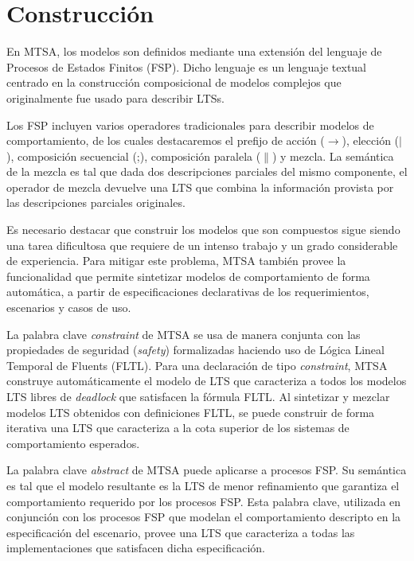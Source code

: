\section{Construcción}

En MTSA, los modelos son definidos mediante una extensión del lenguaje de Procesos de Estados Finitos (FSP). Dicho
lenguaje es un lenguaje textual centrado en la construcción composicional de modelos complejos que originalmente fue
usado para describir LTSs.

Los FSP incluyen varios operadores tradicionales para describir modelos de comportamiento, de los cuales destacaremos el
prefijo de acción ($\rightarrow$), elección ($|$), composición secuencial (;), composición paralela ($\|$) y mezcla.
La semántica de la mezcla es tal que dada dos descripciones parciales del mismo componente, el operador de mezcla
devuelve una LTS que combina la información provista por las descripciones parciales originales.

Es necesario destacar que construir los modelos que son compuestos sigue siendo una tarea dificultosa que requiere de un
intenso trabajo y un grado considerable de experiencia. Para mitigar este problema, MTSA también provee la funcionalidad
que permite sintetizar modelos de comportamiento de forma automática, a partir de especificaciones declarativas de los
requerimientos, escenarios y casos de uso.

La palabra clave \emph{constraint} de MTSA se usa de manera conjunta con las propiedades de seguridad (\emph{safety})
formalizadas haciendo uso de Lógica Lineal Temporal de Fluents (FLTL). Para una declaración de tipo \emph{constraint},
MTSA construye automáticamente el modelo de LTS que caracteriza a todos los modelos LTS libres de \emph{deadlock} que
satisfacen la fórmula FLTL. Al sintetizar y mezclar modelos LTS obtenidos con definiciones FLTL, se puede construir de
forma iterativa una LTS que caracteriza a la cota superior de los sistemas de comportamiento esperados.

La palabra clave \emph{abstract} de MTSA puede aplicarse a procesos FSP. Su semántica es tal que el modelo resultante es
la LTS de menor refinamiento que garantiza el comportamiento requerido por los procesos FSP. Esta palabra clave,
utilizada en conjunción con los procesos FSP que modelan el comportamiento descripto en la especificación del escenario,
provee una LTS que caracteriza a todas las implementaciones que satisfacen dicha especificación.
